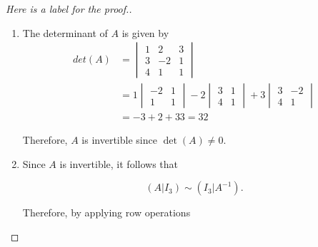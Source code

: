 \documentclass[11pt]{article}
\begin{document}
\begin{proof}[Here is a label for the proof.]\hspace{0pt}
    \begin{enumerate}[leftmargin=*,label=\textit{\alph*})]
    \item The determinant of $A$ is given by
    \begin{align*}
        det(A) & =\begin{vmatrix}
            1 & 2 & 3 \\
            3 &-2 & 1 \\
            4 & 1 & 1
        \end{vmatrix} \\
        & = 1 \begin{vmatrix}
                -2 & 1 \\
                1 & 1
                \end{vmatrix}-2\begin{vmatrix}
                3 & 1 \\
                4 & 1
                \end{vmatrix} + 3 \begin{vmatrix}
                    3 & -2 \\
                    4 & 1
                \end{vmatrix}\\
        & = -3 + 2 + 33 = 32
    \end{align*}

    Therefore, $A$ is invertible since $\det(A) \neq 0$.

    \item
    Since $A$ is invertible, it follows that

    \[
        (A|I_3)\sim (I_3|A^{-1}).
    \]

    Therefore, by applying row operations


\end{enumerate}
\end{proof}
\end{document}
